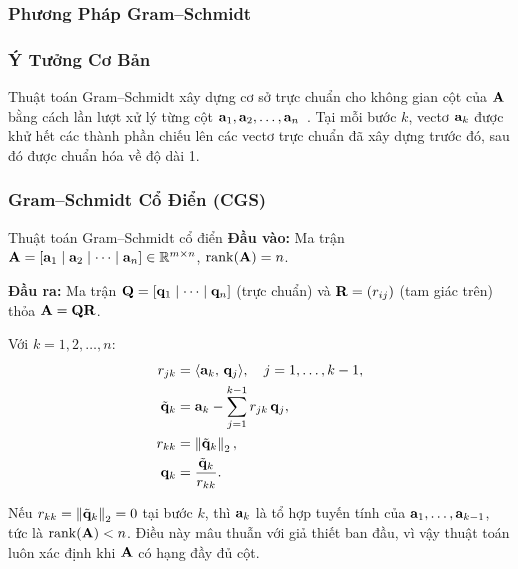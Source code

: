 \subsubsection{Phương Pháp Gram--Schmidt}
\label{sec:gram_schmidt}

\subsubsection{Ý Tưởng Cơ Bản}

Thuật toán Gram--Schmidt xây dựng cơ sở trực chuẩn cho không gian cột của $\mathbf{A}$
bằng cách lần lượt xử lý từng cột $\mathbf{a}_1, \mathbf{a}_2, \ldots, \mathbf{a}_n$~\cite{strang2023}.
Tại mỗi bước $k$, vectơ $\mathbf{a}_k$ được khử hết các thành phần chiếu lên các
vectơ trực chuẩn đã xây dựng trước đó, sau đó được chuẩn hóa về độ dài 1.

\subsubsection{Gram--Schmidt Cổ Điển (CGS)}

\begin{mydef}{Thuật toán Gram--Schmidt cổ điển}{}
\textbf{Đầu vào:} Ma trận $\mathbf{A} = [\mathbf{a}_1 \mid \mathbf{a}_2 \mid \cdots \mid \mathbf{a}_n]
\in \mathbb{R}^{m \times n}$, $\operatorname{rank}(\mathbf{A}) = n$.

\textbf{Đầu ra:} Ma trận $\mathbf{Q} = [\mathbf{q}_1 \mid \cdots \mid \mathbf{q}_n]$ (trực chuẩn)
và $\mathbf{R} = (r_{ij})$ (tam giác trên) thỏa $\mathbf{A} = \mathbf{Q}\mathbf{R}$.

Với $k = 1, 2, \ldots, n$:
\begin{align}
    r_{jk} &= \langle \mathbf{a}_k,\, \mathbf{q}_j \rangle, \quad j = 1, \ldots, k-1, \label{eq:cgs_rjk} \\
    \tilde{\mathbf{q}}_k &= \mathbf{a}_k - \sum_{j=1}^{k-1} r_{jk}\, \mathbf{q}_j, \label{eq:cgs_qtilde} \\
    r_{kk} &= \left\lVert\tilde{\mathbf{q}}_k\right\rVert_2, \label{eq:cgs_rkk} \\
    \mathbf{q}_k &= \frac{\tilde{\mathbf{q}}_k}{r_{kk}}. \label{eq:cgs_qk}
\end{align}
\end{mydef}

\begin{note}
Nếu $r_{kk} = \left\lVert\tilde{\mathbf{q}}_k\right\rVert_2 = 0$ tại bước $k$, thì $\mathbf{a}_k$ là tổ
hợp tuyến tính của $\mathbf{a}_1, \ldots, \mathbf{a}_{k-1}$, tức là $\operatorname{rank}(\mathbf{A}) < n$.
Điều này mâu thuẫn với giả thiết ban đầu, vì vậy thuật toán luôn xác định khi
$\mathbf{A}$ có hạng đầy đủ cột.
\end{note}

